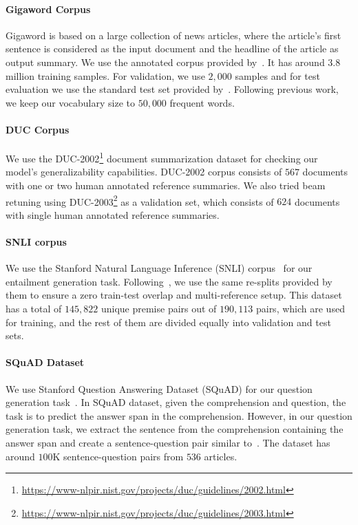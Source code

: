 \documentclass[11pt,a4paper]{article}
\begin{document}
\paragraph{Gigaword Corpus}
Gigaword is based on a large collection of news articles, where the article's first sentence is considered as the input document and the headline of the article as output summary. We use the annotated corpus provided by~. It has around 3.8 million training samples. For validation, we use $2,000$ samples and for test evaluation we use the standard test set provided by~. Following previous work, we keep our vocabulary size to $50,000$ frequent words.


\paragraph{DUC Corpus}
We use the DUC-2002\footnote{\scriptsize{\url{https://www-nlpir.nist.gov/projects/duc/guidelines/2002.html}}} document summarization dataset for checking our model's generalizability capabilities. DUC-2002 corpus consists of $567$ documents with one or two human annotated reference summaries. We also tried beam retuning using DUC-2003\footnote{\scriptsize{\url{https://www-nlpir.nist.gov/projects/duc/guidelines/2003.html}}} as a validation set, which consists of $624$ documents with single human annotated reference summaries.

\paragraph{SNLI corpus}
We use the Stanford Natural Language Inference (SNLI) corpus~\cite{bowman2015large} for our entailment generation task. Following~, we use the same re-splits provided by them to ensure a zero train-test overlap and multi-reference setup. This dataset has a total of $145,822$ unique premise pairs out of $190,113$ pairs, which are used for training, and the rest of them are divided equally into validation and test sets.

\paragraph{SQuAD Dataset}
We use Stanford Question Answering Dataset (SQuAD) for our question generation task~\cite{rajpurkar2016squad}. In SQuAD dataset, given the comprehension and question, the task is to predict the answer span in the comprehension. However, in our question generation task, we extract the sentence from the comprehension containing the answer span and create a sentence-question pair similar to~. The dataset has around $100$K sentence-question pairs from $536$ articles. 
\end{document}
